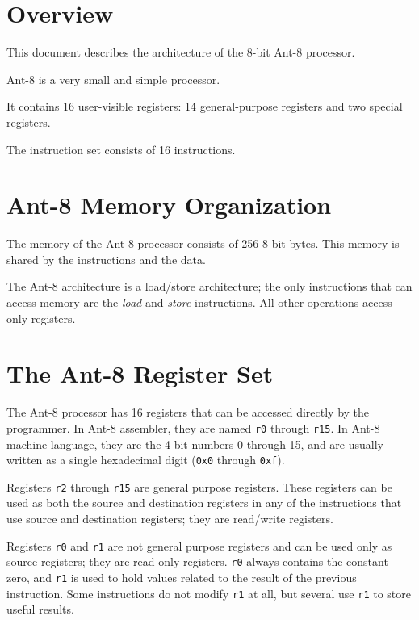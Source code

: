 
\section{Overview}

This document describes the architecture of the 8-bit {\sc Ant-8} processor.

{\sc Ant-8} is a very small and simple processor.

It contains 16 user-visible registers:  14 general-purpose registers
and two special registers.

The instruction set consists of 16 instructions.


\section{{\sc Ant-8} Memory Organization}

The memory of the {\sc Ant-8} processor consists of 256 8-bit
bytes.  This memory is shared by the instructions and the
data.

The {\sc Ant-8} architecture is a load/store architecture; the only
instructions that can access memory are the {\em load} and
{\em store} instructions.  All other operations access only
registers.

\section{The {\sc Ant-8} Register Set}

The {\sc Ant-8} processor has 16 registers that can be accessed directly by
the programmer.  In {\sc Ant-8} assembler, they are named {\tt r0} through
{\tt r15}.  In {\sc Ant-8} machine language, they are the 4-bit numbers 0
through 15, and are usually written as a single hexadecimal digit
({\tt 0x0} through {\tt 0xf}).

Registers {\tt r2} through {\tt r15} are general purpose registers. 
These registers can be used as both the source and destination
registers in any of the instructions that use source and destination
registers; they are read/write registers.

Registers {\tt r0} and {\tt r1} are not general purpose registers and
can be used only as source registers; they are read-only registers. 
{\tt r0} always contains the constant zero, and {\tt r1} is used to
hold values related to the result of the previous instruction.  Some
instructions do not modify {\tt r1} at all, but several use {\tt r1}
to store useful results.

